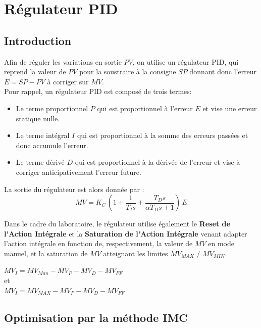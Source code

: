 \section{Régulateur PID}

\subsection{Introduction}

Afin de réguler les variations en sortie $PV$, on utilise un régulateur PID, qui reprend la valeur de $PV$ pour la soustraire à la consigne $SP$ donnant donc l'erreur $E = SP - PV$ à corriger sur $MV$.\\
Pour rappel, un régulateur PID est composé de trois termes:
\begin{itemize}
    \item Le terme proportionnel $P$ qui est proportionnel à l'erreur $E$ et vise une erreur statique nulle.
    \item Le terme intégral $I$ qui est proportionnel à la somme des erreurs passées et donc accumule l'erreur.
    \item Le terme dérivé $D$ qui est proportionnel à la dérivée de l'erreur et vise à corriger anticipativement l'erreur future.
\end{itemize}
La sortie du régulateur est alors donnée par :
\begin{equation}\label{eq:PID}
    MV = K_C \, \left( 1 + \frac{1}{T_I s} + \frac{T_D s}{\alpha T_D s + 1}\right) \, E
\end{equation}

Dans le cadre du laboratoire, le régulateur utilise également le \textbf{Reset de l'Action Intégrale} et la \textbf{Saturation de l'Action Intégrale} venant adapter l'action intégrale en fonction de, respectivement, la valeur de $MV$ en mode manuel, et la saturation de $MV$ atteignant les limites $MV_{MAX}$ / $MV_{MIN}$.
\begin{center}
    $MV_I = MV_{Man} - MV_P - MV_D - MV_{FF}$\\[4pt]
    et\\[4pt]
    $MV_I = MV_{MAX} - MV_P - MV_D - MV_{FF}$
\end{center}

\subsection{Optimisation par la méthode IMC}

